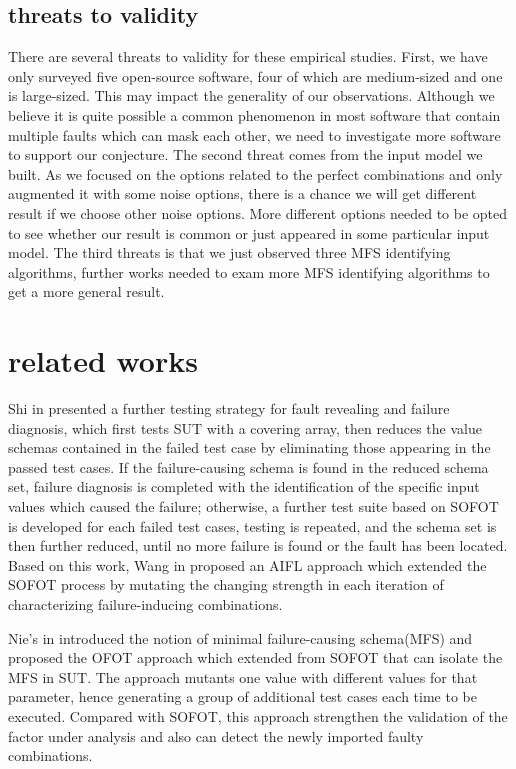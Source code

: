 \documentclass{sig-alternate}
\begin{document}
\subsection{threats to validity}
There are several threats to validity for these empirical studies. First, we have only surveyed five open-source software, four of which are medium-sized and one is large-sized. This may impact the generality of our observations. Although we believe it is quite possible a common phenomenon in most software that contain multiple faults which can mask each other, we need to investigate more software to support our conjecture. The second threat comes from the input model we built. As we focused on the options related to the perfect combinations and only augmented it with some noise options, there is a chance we will get different result if we choose other noise options. More different options needed to be opted to see whether our result is common or just appeared in some particular input model. The third threats is that we just observed three MFS identifying algorithms, further works needed to exam more MFS identifying algorithms to get a more general result.

\section{related works}

Shi in \cite{shi2005software} presented a further testing strategy for fault revealing and failure diagnosis, which ﬁrst tests SUT with a covering array, then reduces the value schemas contained in the failed test case by eliminating those appearing in the passed test cases. If the failure-causing schema is found in the reduced schema set, failure diagnosis is completed with the identiﬁcation of the speciﬁc input values which caused the failure;
otherwise, a further test suite based on SOFOT is developed for each failed test cases,
testing is repeated, and the schema set is then further reduced, until no more failure
is found or the fault has been located. Based on this work, Wang in \cite{wang2010adaptive} proposed an AIFL approach which extended the SOFOT process by mutating the changing strength in each iteration of characterizing failure-inducing combinations.

Nie's in \cite{nie2011minimal} introduced the notion of minimal failure-causing schema(MFS) and proposed the OFOT approach which extended from SOFOT that can isolate the MFS in SUT. The approach mutants one value with different values for that parameter, hence generating a group of additional test cases each time to be executed. Compared with SOFOT, this approach  strengthen the validation of the factor under analysis and also can detect the newly imported faulty combinations.
\end{document}
